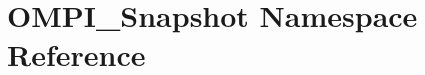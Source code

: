 \hypertarget{namespaceOMPI__Snapshot}{\section{O\-M\-P\-I\-\_\-\-Snapshot Namespace Reference}
\label{namespaceOMPI__Snapshot}
}
